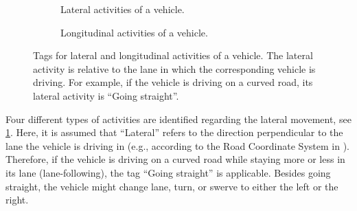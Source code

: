 \begin{figure}
	\centering
	\begin{subfigure}{\linewidth}
		\centering
		\caption{Lateral activities of a vehicle.}
		\label{fig:tree vehicle lat act}
	\end{subfigure}
	\begin{subfigure}{\linewidth}
		\centering
		\caption{Longitudinal activities of a vehicle.}
		\label{fig:tree vehicle long act}
	\end{subfigure}
	\caption{Tags for lateral and longitudinal activities of a vehicle. The lateral activity is relative to the lane in which the corresponding vehicle is driving. For example, if the vehicle is driving on a curved road, its lateral activity is ``Going straight''.}
	\label{fig:tree vehicle activities}
\end{figure}

Four different types of activities are identified regarding the lateral movement, see \cref{fig:tree vehicle lat act}. Here, it is assumed that ``Lateral'' refers to the direction perpendicular to the lane the vehicle is driving in (e.g., according to the Road Coordinate System in \cite{zofka2015datadrivetrafficscenarios}). Therefore, if the vehicle is driving on a curved road while staying more or less in its lane (lane-following), the tag ``Going straight'' is applicable. Besides going straight, the vehicle might change lane, turn, or swerve to either the left or the right.

